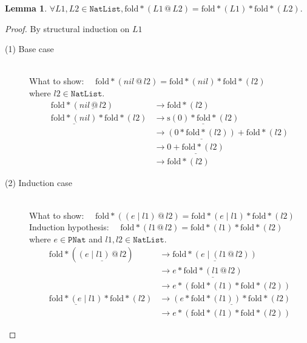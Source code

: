 \documentclass[12pt, a4paper]{article}
\newtheorem{lemma}[theorem]{Lemma}
\begin{document}
\begin{lemma}
\label{lm1}
$\forall L1, L2 \in \mathtt{NatList}, \mathrm{fold*}(L1 \mathrel{@} L2) = \mathrm{fold*}(L1) \mathrel{*} \mathrm{fold*}(L2).$
\end{lemma}
\begin{proof}
By structural induction on $L1$

\begin{description}

\item[(1) Base case]~\\
What to show: $\quad \mathrm{fold*}(nil \mathrel{@} l2) = \mathrm{fold*}(nil) \mathrel{*} \mathrm{fold*}(l2)$\\
where $l2 \in \mathtt{NatList}$.
\begin{align*}
\mathrm{fold*}(\underline{nil \mathrel{@} l2}) &\longrightarrow \mathrm{fold*}(l2) \tag{by @1} \\
\underline{\mathrm{fold*}(nil)} \mathrel{*} \mathrm{fold*}(l2) &\longrightarrow \underline{\mathrm{s}(0) \mathrel{*} \mathrm{fold*}(l2)} \tag{by fold*-1} \\
&\longrightarrow \underline{(0 \mathrel{*} \mathrm{fold*}(l2))} \mathrel{+} \mathrm{fold*}(l2) \tag{by *2} \\
&\longrightarrow \underline{0 \mathrel{+} \mathrm{fold*}(l2)} \tag{by *1} \\
&\longrightarrow \mathrm{fold*}(l2) \tag{by +1}
\end{align*}

\item[(2) Induction case]~\\
What to show: $\quad  \mathrm{fold*}((e \mathrel{|} l1) \mathrel{@} l2) = \mathrm{fold*}(e \mathrel{|} l1) \mathrel{*} \mathrm{fold*}(l2)$\\
Induction hypothesis: $\quad  \mathrm{fold*}(l1 \mathrel{@} l2) = \mathrm{fold*}(l1) \mathrel{*} \mathrm{fold*}(l2)$\\
where $e \in \mathtt{PNat}$ and $l1, l2 \in \mathtt{NatList}$.
\begin{align*}
\mathrm{fold*}(\underline{(e \mathrel{|} l1) \mathrel{@} l2}) &\longrightarrow \underline{\mathrm{fold*}(e \mathrel{|} (l1 \mathrel{@} l2))} \tag{by @2} \\
&\longrightarrow e \mathrel{*} \underline{\mathrm{fold*}(l1 \mathrel{@} l2)} \tag{by fold*-2} \\
&\longrightarrow e \mathrel{*} (\mathrm{fold*}(l1) \mathrel{*} \mathrm{fold*}(l2)) \tag{by IH} \\
\underline{\mathrm{fold*}(e \mathrel{|} l1)} \mathrel{*} \mathrm{fold*}(l2) &\longrightarrow \underline{(e \mathrel{*} \mathrm{fold*}(l1)) \mathrel{*} \mathrm{fold*}(l2)} \tag{by fold*-2} \\
&\longrightarrow e \mathrel{*} (\mathrm{fold*}(l1) \mathrel{*} \mathrm{fold*}(l2)) \tag{by assoc*}
\end{align*}
\end{description}

\end{proof}
\end{document}
